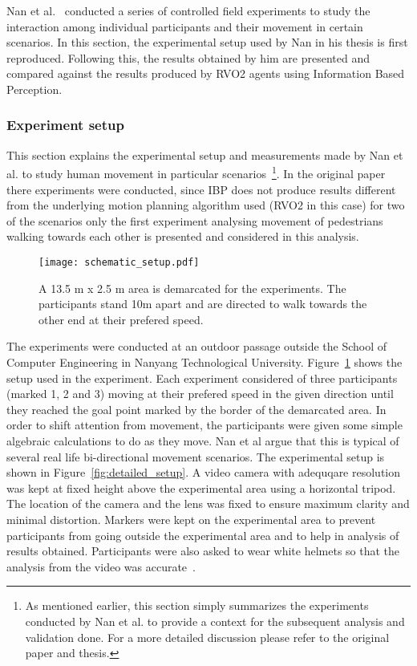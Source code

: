 Nan et al.~\cite{hunanpaper,hunanthesis} conducted a series of controlled field experiments to study the interaction among individual participants and their movement in certain scenarios. In this section, the experimental setup used by Nan in his thesis is first reproduced. Following this, the results obtained by him are presented and compared against the results produced by RVO2 agents using Information Based Perception.

\subsubsection{Experiment setup} %
\label{sec:experiment_setup}

This section explains the experimental setup and measurements made by Nan et al. to study human movement in particular scenarios~\footnote{As mentioned earlier, this section simply summarizes the experiments conducted by Nan et al. to provide a context for the subsequent analysis and validation done. For a more detailed discussion please refer to the original paper and thesis.}. In the original paper there experiments were conducted, since IBP does not produce results different from the underlying motion planning algorithm used (RVO2 in this case) for two of the scenarios only the first experiment analysing movement of pedestrians walking towards each other is presented and considered in this analysis.

\begin{figure}[!tbhp]
    \begin{center}
        \texttt{[image: schematic\_setup.pdf]}
    \end{center}
    \caption{A 13.5 m x 2.5 m area is demarcated for the experiments. The participants stand 10m apart and are directed to walk towards the other end at their prefered speed.}
    \label{fig:schematic_setup}
\end{figure}


The experiments were conducted at an outdoor passage outside the School of Computer Engineering in Nanyang Technological University. Figure~\ref{fig:schematic_setup} shows the setup used in the experiment. Each experiment considered of three participants (marked 1, 2 and 3) moving at their prefered speed in the given direction until they reached the goal point marked by the border of the demarcated area. In order to shift attention from movement, the participants were given some simple algebraic calculations to do as they move. Nan et al argue that this is typical of several real life bi-directional movement scenarios. The experimental setup is shown in Figure~\ref{fig:detailed_setup}. A video camera with adequqare resolution was kept at fixed height above the experimental area using a horizontal tripod. The location of the camera and the lens was fixed to ensure maximum clarity and minimal distortion. Markers were kept on the experimental area to prevent participants from going outside the experimental area and to help in analysis of results obtained. Participants were also asked to wear white helmets so that the analysis from the video was accurate~\cite{W:2004tp}.


